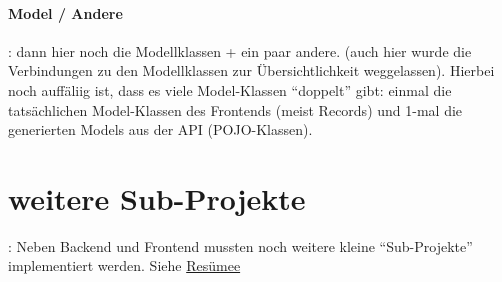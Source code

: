 \paragraph{Model / Andere}:
dann hier noch die Modellklassen + ein paar andere. (auch hier wurde die Verbindungen zu den Modellklassen zur Übersichtlichkeit weggelassen). Hierbei noch auffäliig ist, dass es viele Model-Klassen \enquote{doppelt} gibt: einmal die tatsächlichen Model-Klassen des Frontends (meist Records) und 1-mal die generierten Models aus der API (POJO-Klassen).
% 
% 
\section{weitere Sub-Projekte}:
Neben Backend und Frontend mussten noch weitere kleine \enquote{Sub-Projekte} implementiert werden. Siehe \hyperref[ref:resumee]{Resümee}